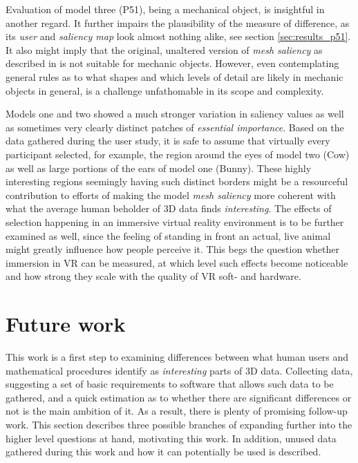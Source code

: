 Evaluation of model three (P51), being a mechanical object, is insightful in another regard. It further impairs the plausibility of the measure of difference, as its \textit{user} and \textit{saliency map} look almost nothing alike, see section \ref{sec:results_p51}. It also might imply that the original, unaltered version of \textit{mesh saliency} as described in \cite{lee2005mesh} is not suitable for mechanic objects. However, even contemplating general rules as to what shapes and which levels of detail are likely in mechanic objects in general, is a challenge unfathomable in its scope and complexity.

Models one and two showed a much stronger variation in saliency values as well as sometimes very clearly distinct patches of \textit{essential importance}. Based on the data gathered during the user study, it is safe to assume that virtually every participant selected, for example, the region around the eyes of model two (Cow) as well as large portions of the ears of model one (Bunny). These highly interesting regions seemingly having such distinct borders might be a resourceful contribution to efforts of making the model \textit{mesh saliency} more coherent with what the average human beholder of 3D data finds \textit{interesting}. The effects of selection happening in an immersive virtual reality environment is to be further examined as well, since the feeling of standing in front an actual, live animal might greatly influence how people perceive it. This begs the question whether immersion in VR can be measured, at which level such effects become noticeable and how strong they scale with the quality of VR soft- and hardware.

\section{Future work}
\label{future_work}

This work is a first step to examining differences between what human users and mathematical procedures identify as \textit{interesting} parts of 3D data. Collecting data, suggesting a set of basic requirements to software that allows such data to be gathered, and a quick estimation as to whether there are significant differences or not is the main ambition of it. As a result, there is plenty of promising follow-up work. This section describes three possible branches of expanding further into the higher level questions at hand, motivating this work. In addition, unused data gathered during this work and how it can potentially be used is described.

